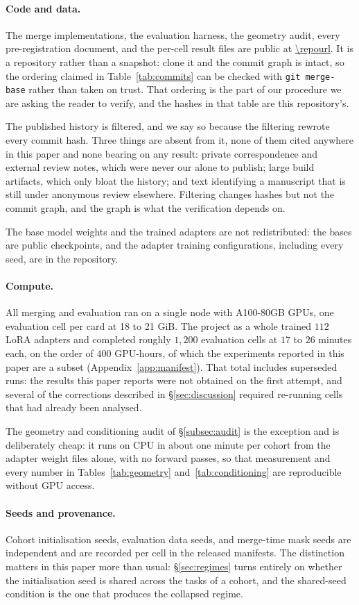 \paragraph{Code and data.} The merge implementations, the evaluation
harness, the geometry audit, every pre-registration document, and the
per-cell result files are public at \url{\repourl}. It is a repository
rather than a snapshot: clone it and the commit graph is intact, so the
ordering claimed in Table~\ref{tab:commits} can be checked with
\texttt{git merge-base} rather than taken on trust. That ordering is the
part of our procedure we are asking the reader to verify, and the hashes in
that table are this repository's.

The published history is filtered, and we say so because the filtering
rewrote every commit hash. Three things are absent from it, none of them
cited anywhere in this paper and none bearing on any result: private
correspondence and external review notes, which were never our alone to
publish; large build artifacts, which only bloat the history; and text
identifying a manuscript that is still under anonymous review elsewhere.
Filtering changes hashes but not the commit graph, and the graph is what
the verification depends on.

The base model weights and the trained adapters are not redistributed: the
bases are public checkpoints, and the adapter training configurations,
including every seed, are in the repository.

\paragraph{Compute.} All merging and evaluation ran on a single node with
A100-80GB GPUs, one evaluation cell per card at 18 to 21 GiB. The project
as a whole trained $112$ LoRA adapters and completed roughly $1{,}200$
evaluation cells at $17$ to $26$ minutes each, on the order of $400$
GPU-hours, of which the experiments reported in this paper are a subset
(Appendix~\ref{app:manifest}). That total includes superseded runs: the
results this paper reports were not obtained on the first attempt, and
several of the corrections described in \S\ref{sec:discussion} required
re-running cells that had already been analysed.

The geometry and conditioning audit of \S\ref{subsec:audit} is the
exception and is deliberately cheap: it runs on CPU in about one minute
per cohort from the adapter weight files alone, with no forward passes, so
that measurement and every number in Tables~\ref{tab:geometry}
and~\ref{tab:conditioning} are reproducible without GPU access.

\paragraph{Seeds and provenance.} Cohort initialisation seeds, evaluation
data seeds, and merge-time mask seeds are independent and are recorded
per cell in the released manifests. The distinction matters in this paper
more than usual: \S\ref{sec:regimes} turns entirely on whether the
initialisation seed is shared across the tasks of a cohort, and the
shared-seed condition is the one that produces the collapsed regime.
